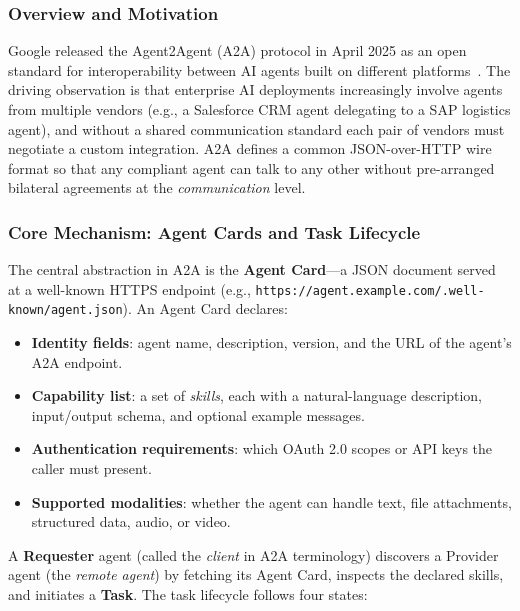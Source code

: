 \documentclass[conference]{IEEEtran}
\begin{document}
\subsubsection{Overview and Motivation}

Google released the Agent2Agent (A2A) protocol in April 2025 as an
open standard for interoperability between AI agents built on different
platforms~\cite{google_a2a}.  The driving observation is that
enterprise AI deployments increasingly involve agents from multiple
vendors (e.g., a Salesforce CRM agent delegating to a SAP logistics
agent), and without a shared communication standard each pair of
vendors must negotiate a custom integration.  A2A defines a common
JSON-over-HTTP wire format so that any compliant agent can talk to any
other without pre-arranged bilateral agreements at the
\emph{communication} level.

\subsubsection{Core Mechanism: Agent Cards and Task Lifecycle}

The central abstraction in A2A is the \textbf{Agent Card}---a
JSON document served at a well-known HTTPS endpoint
(e.g., \texttt{https://agent.example.com/.well-known/agent.json}).
An Agent Card declares:

\begin{itemize}
  \item \textbf{Identity fields}: agent name, description, version,
    and the URL of the agent's A2A endpoint.
  \item \textbf{Capability list}: a set of \emph{skills}, each with a
    natural-language description, input/output schema, and optional
    example messages.
  \item \textbf{Authentication requirements}: which OAuth 2.0 scopes
    or API keys the caller must present.
  \item \textbf{Supported modalities}: whether the agent can handle
    text, file attachments, structured data, audio, or video.
\end{itemize}

A \textbf{Requester} agent (called the \emph{client} in A2A
terminology) discovers a Provider agent (the \emph{remote agent}) by
fetching its Agent Card, inspects the declared skills, and initiates a
\textbf{Task}.  The task lifecycle follows four states:
\end{document}
